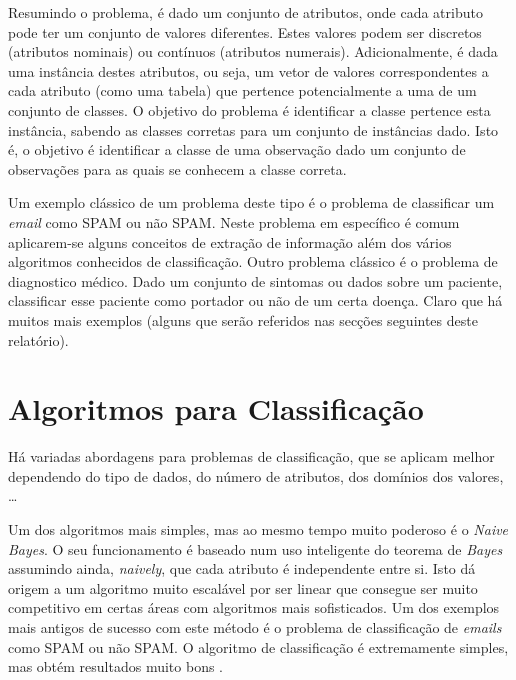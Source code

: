 \documentclass[12pt,a4paper,oneside]{article}
\begin{document}
Resumindo o problema, é dado um conjunto de atributos, onde cada
atributo pode ter um conjunto de valores diferentes. Estes valores
podem ser discretos (atributos nominais) ou contínuos (atributos
numerais). Adicionalmente, é dada uma instância destes atributos, ou
seja, um vetor de valores correspondentes a cada atributo (como uma
tabela) que pertence potencialmente a uma de um conjunto de classes. O
objetivo do problema é identificar a classe pertence esta instância,
sabendo as classes corretas para um conjunto de instâncias dado. Isto
é, o objetivo é identificar a classe de uma observação dado um
conjunto de observações para as quais se conhecem a classe correta.

Um exemplo clássico de um problema deste tipo é o problema de
classificar um \textit{email} como SPAM ou não SPAM. Neste problema em
específico é comum aplicarem-se alguns conceitos de extração de
informação além dos vários algoritmos conhecidos de
classificação. Outro problema clássico é o problema de diagnostico
médico. Dado um conjunto de sintomas ou dados sobre um paciente,
classificar esse paciente como portador ou não de um certa
doença. Claro que há muitos mais exemplos (alguns que serão referidos
nas secções seguintes deste relatório).


\section{Algoritmos para Classificação}
\label{sec:alg}

Há variadas abordagens para problemas de classificação, que se aplicam
melhor dependendo do tipo de dados, do número de atributos, dos
domínios dos valores, \ldots

Um dos algoritmos mais simples, mas ao mesmo tempo muito poderoso é o
\textit{Naive Bayes}. O seu funcionamento é baseado num uso
inteligente do teorema de \textit{Bayes} assumindo ainda,
\textit{naively}, que cada atributo é independente entre si. Isto dá
origem a um algoritmo muito escalável por ser linear que consegue ser
muito competitivo em certas áreas com algoritmos mais sofisticados. Um
dos exemplos mais antigos de sucesso com este método é o problema de
classificação de \textit{emails} como SPAM ou não SPAM. O algoritmo de
classificação é extremamente simples, mas obtém resultados muito bons
\cite{sahami:1998}.
\end{document}

